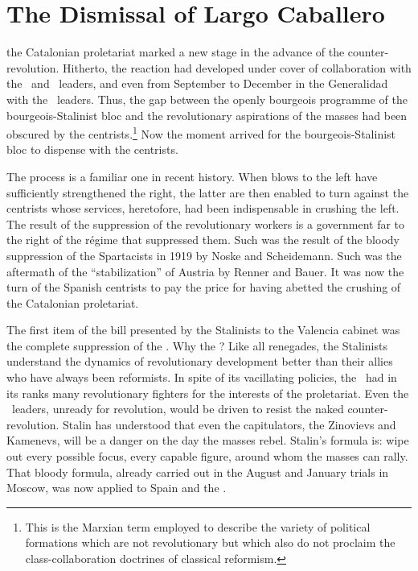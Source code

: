 \chapter{The Dismissal of Largo Caballero}

 the Catalonian proletariat marked a new stage in the advance of the counter-revolution. Hitherto, the reaction had developed under cover of collaboration with the \CNT\ and \UGT\ leaders, and even from September to December in the Generalidad with the \POUM\ leaders. Thus, the gap between the openly bourgeois programme of the bourgeois-Stalinist bloc and the revolutionary aspirations of the masses had been obscured by the centrists.\footnote{This is the Marxian term employed to describe the variety of political formations which are not revolutionary but which also do not proclaim the class-collaboration doctrines of classical reformism.} Now the moment arrived for the bourgeois-Stalinist bloc to dispense with the centrists.

The process is a familiar one in recent history. When blows to the left have sufficiently strengthened the right, the latter are then enabled to turn against the centrists whose services, heretofore, had been indispensable in crushing the left. The result of the suppression of the revolutionary workers is a government far to the right of the régime that suppressed them. Such was the result of the bloody suppression of the Spartacists in 1919 by Noske and Scheidemann. Such was the aftermath of the ``stabilization'' of Austria by Renner and Bauer. It was now the turn of the Spanish centrists to pay the price for having abetted the crushing of the Catalonian proletariat.

The first item of the bill presented by the Stalinists to the Valencia cabinet was the complete suppression of the \POUM. Why the \POUM? Like all renegades, the Stalinists understand the dynamics of revolutionary development better than their allies who have always been reformists. In spite of its vacillating policies, the \POUM\ had in its ranks many revolutionary fighters for the interests of the proletariat. Even the \POUM\ leaders, unready for revolution, would be driven to resist the naked counter-revolution. Stalin has understood that even the capitulators, the Zinovievs and Kamenevs, will be a danger on the day the masses rebel. Stalin’s formula is: wipe out every possible focus, every capable figure, around whom the masses can rally. That bloody formula, already carried out in the August and January trials in Moscow, was now applied to Spain and the \POUM.


